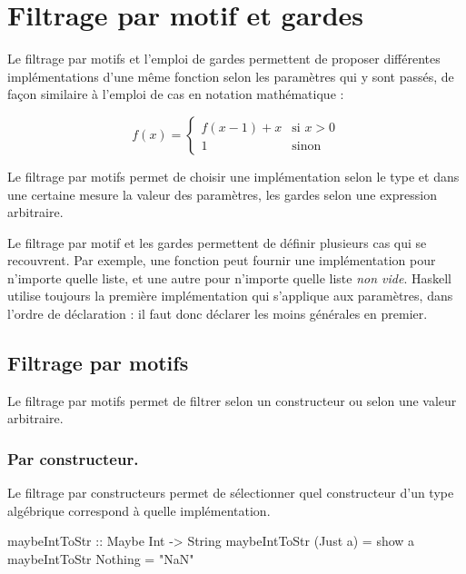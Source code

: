 \section{Filtrage par motif et gardes}
\label{pattern-matching-and-guards}

Le filtrage par motifs et l'emploi de gardes permettent de proposer différentes implémentations d'une même fonction selon les paramètres qui y sont passés, de façon similaire à l'emploi de cas en notation mathématique :

\[
 f(x) =
  \begin{cases}
   f(x-1) + x & \text{si } x > 0 \\
   1          & \text{sinon}
  \end{cases}
\]

Le filtrage par motifs permet de choisir une implémentation selon le type et dans une certaine mesure la valeur des paramètres, les gardes selon une expression arbitraire.

\begin{infobox}
Le filtrage par motif et les gardes permettent de définir plusieurs cas qui se recouvrent. Par exemple, une fonction peut fournir une implémentation pour n'importe quelle liste, et une autre pour n'importe quelle liste \emph{non vide}. Haskell utilise toujours la première implémentation qui s'applique aux paramètres, dans l'ordre de déclaration : il faut donc déclarer les moins générales en premier.
\end{infobox}

\subsection{Filtrage par motifs}
\label{pattern-matching}

Le filtrage par motifs permet de filtrer selon un constructeur ou selon une valeur arbitraire.

\subsubsection{Par constructeur.} Le filtrage par constructeurs permet de sélectionner quel constructeur d'un type algébrique  correspond à quelle implémentation.

\begin{haskellcode}
maybeIntToStr :: Maybe Int -> String
maybeIntToStr (Just a) = show a
maybeIntToStr Nothing  = "NaN"
\end{haskellcode}

